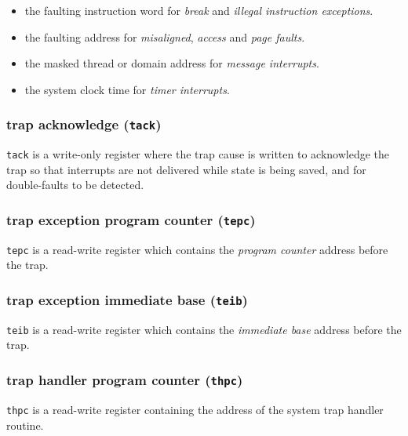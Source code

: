 \begin{itemize}[itemsep=0pt]
\item the faulting instruction word for \emph{break} and \emph{illegal instruction exceptions}.
\item the faulting address for \emph{misaligned}, \emph{access} and \emph{page faults}.
\item the masked thread or domain address for \emph{message interrupts}.
\item the system clock time for \emph{timer interrupts}.
\end{itemize}


\newpage
\subsubsection{trap acknowledge (\texttt{tack})}
\texttt{tack} is a write-only register where the trap cause is written
to acknowledge the trap so that interrupts are not delivered
while state is being saved, and for double-faults to be detected.
\\

\subsubsection{trap exception program counter (\texttt{tepc})}
\texttt{tepc} is a read-write register which contains the \emph{program
counter} address before the trap.
\\

\subsubsection{trap exception immediate base (\texttt{teib})}
\texttt{teib} is a read-write register which contains the \emph{immediate
base} address before the trap.
\\

\subsubsection{trap handler program counter (\texttt{thpc})}
\texttt{thpc} is a read-write register containing the address of the
system trap handler routine.
\\

